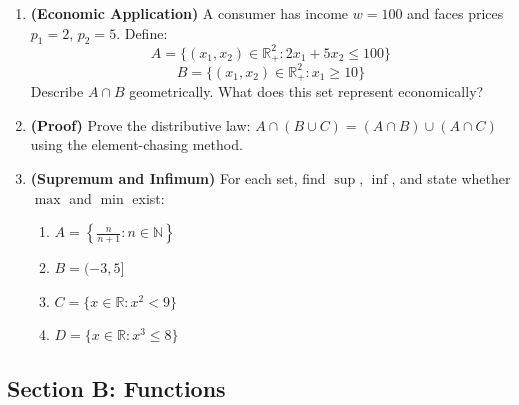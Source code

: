 \documentclass[12pt, a4paper]{article}
\theoremstyle{definition}
\newcommand{\R}{\mathbb{R}}
\newcommand{\N}{\mathbb{N}}
\begin{document}
\begin{enumerate}[label=\textbf{A\arabic*.}, leftmargin=2.5em]
  \item \textbf{(Economic Application)} A consumer has income $w = 100$ and faces prices $p_1 = 2$, $p_2 = 5$. Define:
    \[A = \{(x_1,x_2)\in\R^2_+ : 2x_1 + 5x_2 \leq 100\}\]
    \[B = \{(x_1,x_2)\in\R^2_+ : x_1 \geq 10\}\]
    Describe $A \cap B$ geometrically. What does this set represent economically?

  \item \textbf{(Proof)} Prove the distributive law: $A \cap (B \cup C) = (A \cap B) \cup (A \cap C)$ using the element-chasing method.

  \item \textbf{(Supremum and Infimum)} For each set, find $\sup$, $\inf$, and state whether $\max$ and $\min$ exist:
  \begin{enumerate}[label=(\alph*)]
    \item $A = \left\{\frac{n}{n+1} : n \in \N\right\}$
    \item $B = (-3, 5]$
    \item $C = \{x \in \R : x^2 < 9\}$
    \item $D = \{x \in \R : x^3 \leq 8\}$
  \end{enumerate}
\end{enumerate}
\newpage
\subsection{Section B: Functions}
\end{document}

